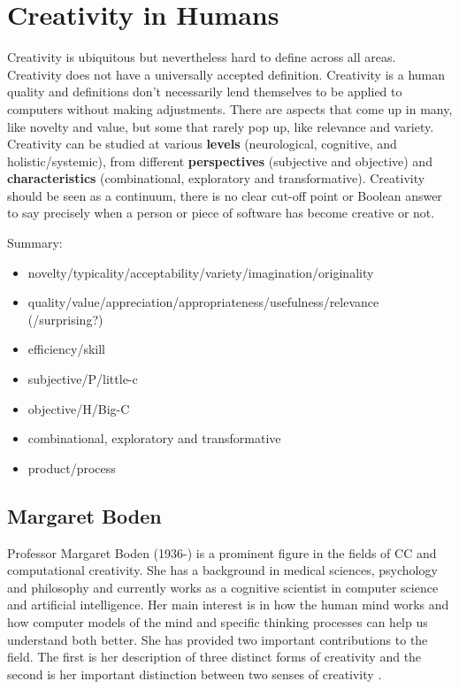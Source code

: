 
\section{Creativity in Humans}

Creativity is ubiquitous but nevertheless hard to define across all areas.
Creativity does not have a universally accepted definition. Creativity is a human quality and definitions don’t necessarily lend themselves to be applied to computers without making adjustments. There are aspects that come up in many, like novelty and value, but some that rarely pop up, like relevance and variety. Creativity can be studied at various \textbf{levels} (neurological, cognitive, and holistic/systemic), from different \textbf{perspectives} (subjective and objective) and \textbf{characteristics} (combinational, exploratory and transformative). Creativity should be seen as a continuum, there is no clear cut-off point or Boolean answer to say precisely when a person or piece of software has become creative or not.

\begin{shaded}
Summary:\\
\begin{itemize}
\item novelty/typicality/acceptability/variety/imagination/originality
\item quality/value/appreciation/appropriateness/usefulness/relevance (/surprising?)
\item efficiency/skill
\item subjective/P/little-c
\item objective/H/Big-C
\item combinational, exploratory and transformative
\item product/process
\end{itemize}
\end{shaded}

\citep{Berners-Lee1998, Everitt2013, Everitt2012}

\subsection{Margaret Boden}

Professor Margaret Boden (1936-) is a prominent figure in the fields of CC and computational creativity. She has a background in medical sciences, psychology and philosophy and currently works as a cognitive scientist in computer science and artificial intelligence. Her main interest is in how the human mind works and how computer models of the mind and specific thinking processes can help us understand both better. She has provided two important contributions to the field. The first is her description of three distinct forms of creativity and the second is her important distinction between two senses of creativity \citep{Boden2003}.

